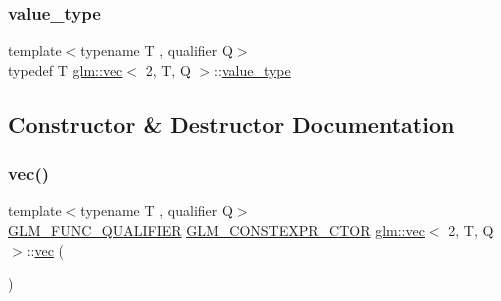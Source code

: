 \mbox{\label{structglm_1_1vec_3_012_00_01_t_00_01_q_01_4_ab44999b08d6a5e2c26e7708ada237759}} 
\subsubsection{\texorpdfstring{value\+\_\+type}{value\_type}}
{\footnotesize\ttfamily template$<$typename T , qualifier Q$>$ \\
typedef T \hyperlink{structglm_1_1vec}{glm\+::vec}$<$ 2, T, Q $>$\+::\hyperlink{structglm_1_1vec_3_012_00_01_t_00_01_q_01_4_ab44999b08d6a5e2c26e7708ada237759}{value\+\_\+type}}



\subsection{Constructor \& Destructor Documentation}
\mbox{\label{structglm_1_1vec_3_012_00_01_t_00_01_q_01_4_a5f9f2f93b75d46552dc284dcbc1bb2d5}} 
\subsubsection{\texorpdfstring{vec()}{vec()}\hspace{0.1cm}{\footnotesize\ttfamily [1/17]}}
{\footnotesize\ttfamily template$<$typename T , qualifier Q$>$ \\
\hyperlink{setup_8hpp_a33fdea6f91c5f834105f7415e2a64407}{G\+L\+M\+\_\+\+F\+U\+N\+C\+\_\+\+Q\+U\+A\+L\+I\+F\+I\+ER} \hyperlink{setup_8hpp_ad34178a09666081abdb573c14d1f4a5a}{G\+L\+M\+\_\+\+C\+O\+N\+S\+T\+E\+X\+P\+R\+\_\+\+C\+T\+OR} \hyperlink{structglm_1_1vec}{glm\+::vec}$<$ 2, T, Q $>$\+::\hyperlink{structglm_1_1vec}{vec} (\begin{DoxyParamCaption}{ }\end{DoxyParamCaption})}

\mbox{\label{structglm_1_1vec_3_012_00_01_t_00_01_q_01_4_ad1785b216e3d6fa5f833c4cd58863cc4}} 
